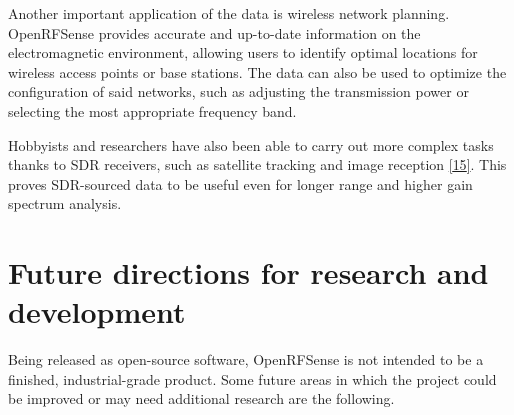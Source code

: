 \documentclass[
  letterpaper,
  a4paper,
  12pt,
  titlepage,
  oneside,
  openany]{book}
\begin{document}
Another important application of the data is wireless network planning.
OpenRFSense provides accurate and up-to-date information on the
electromagnetic environment, allowing users to identify optimal
locations for wireless access points or base stations. The data can also
be used to optimize the configuration of said networks, such as
adjusting the transmission power or selecting the most appropriate
frequency band.

Hobbyists and researchers have also been able to carry out more complex
tasks thanks to SDR receivers, such as satellite tracking and image
reception
\protect\hyperlink{ref-peraltaSatelliteTelemetryImage2018}{{[}15{]}}.
This proves SDR-sourced data to be useful even for longer range and
higher gain spectrum analysis.

\hypertarget{future-directions-for-research-and-development}{%
\section{Future directions for research and
development}\label{future-directions-for-research-and-development}}

Being released as open-source software, OpenRFSense is not intended to
be a finished, industrial-grade product. Some future areas in which the
project could be improved or may need additional research are the
following.
\end{document}
